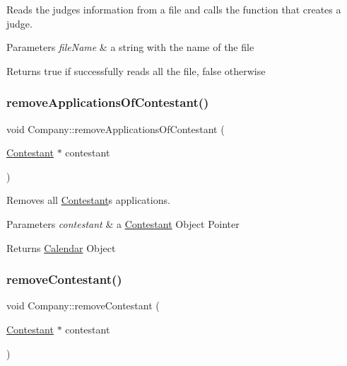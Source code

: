Reads the judges information from a file and calls the function that creates a judge. 


\begin{DoxyParams}{Parameters}
{\em file\+Name} & a string with the name of the file \\
\hline
\end{DoxyParams}
\begin{DoxyReturn}{Returns}
true if successfully reads all the file, false otherwise 
\end{DoxyReturn}
\mbox{\label{class_company_a60f441b02e7db24f47b82e4dcd1a1e17}} 
\subsubsection{\texorpdfstring{remove\+Applications\+Of\+Contestant()}{removeApplicationsOfContestant()}}
{\footnotesize\ttfamily void Company\+::remove\+Applications\+Of\+Contestant (\begin{DoxyParamCaption}\item[{\hyperlink{class_contestant}{Contestant} $\ast$}]{contestant }\end{DoxyParamCaption})}



Removes all \hyperlink{class_contestant}{Contestant}\textquotesingle{}s applications. 


\begin{DoxyParams}{Parameters}
{\em contestant} & a \hyperlink{class_contestant}{Contestant} Object Pointer \\
\hline
\end{DoxyParams}
\begin{DoxyReturn}{Returns}
\hyperlink{class_calendar}{Calendar} Object 
\end{DoxyReturn}
\mbox{\label{class_company_acccfc131326fef9d641bdab101d0cb9e}} 
\subsubsection{\texorpdfstring{remove\+Contestant()}{removeContestant()}}
{\footnotesize\ttfamily void Company\+::remove\+Contestant (\begin{DoxyParamCaption}\item[{\hyperlink{class_contestant}{Contestant} $\ast$}]{contestant }\end{DoxyParamCaption})}



